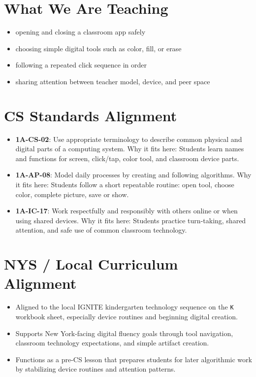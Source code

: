 \documentclass[11pt]{article}
\begin{document}
\section*{What We Are Teaching}
\begin{itemize}[leftmargin=*]
\item opening and closing a classroom app safely
\item choosing simple digital tools such as color, fill, or erase
\item following a repeated click sequence in order
\item sharing attention between teacher model, device, and peer space
\end{itemize}

\section*{CS Standards Alignment}
\begin{itemize}[leftmargin=*]
\item \textbf{1A-CS-02}: Use appropriate terminology to describe common physical and digital parts of a computing system. Why it fits here: Students learn names and functions for screen, click/tap, color tool, and classroom device parts.
\item \textbf{1A-AP-08}: Model daily processes by creating and following algorithms. Why it fits here: Students follow a short repeatable routine: open tool, choose color, complete picture, save or show.
\item \textbf{1A-IC-17}: Work respectfully and responsibly with others online or when using shared devices. Why it fits here: Students practice turn-taking, shared attention, and safe use of common classroom technology.
\end{itemize}

\section*{NYS / Local Curriculum Alignment}
\begin{itemize}[leftmargin=*]
\item Aligned to the local IGNITE kindergarten technology sequence on the \texttt{K} workbook sheet, especially device routines and beginning digital creation.
\item Supports New York-facing digital fluency goals through tool navigation, classroom technology expectations, and simple artifact creation.
\item Functions as a pre-CS lesson that prepares students for later algorithmic work by stabilizing device routines and attention patterns.
\end{itemize}
\end{document}
